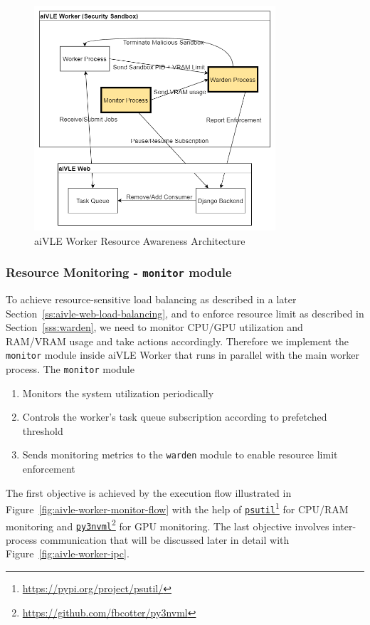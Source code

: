 \begin{figure}[H]
    \centering
    \includegraphics[width=0.8\textwidth]{images/aivle-worker-resource-awareness-arch.png}
    \caption{aiVLE Worker Resource Awareness Architecture}
    \label{fig:aivle-worker-resource-awareness-arch}
\end{figure}

\subsubsection{Resource Monitoring - \texttt{monitor} module}
\label{sss:monitor}
To achieve resource-sensitive load balancing as described in a later Section~\ref{ss:aivle-web-load-balancing}, and to enforce resource limit as described in Section~\ref{sss:warden}, we need to monitor CPU/GPU utilization and RAM/VRAM usage and take actions accordingly. Therefore we implement the \texttt{monitor} module inside aiVLE Worker that runs in parallel with the main worker process. The \texttt{monitor} module
\begin{enumerate}
    \item Monitors the system utilization periodically
    \item Controls the worker's task queue subscription according to prefetched threshold
    \item Sends monitoring metrics to the \texttt{warden} module to enable resource limit enforcement
\end{enumerate}

The first objective is achieved by the execution flow illustrated in Figure~\ref{fig:aivle-worker-monitor-flow} with the help of \href{https://pypi.org/project/psutil/}{\texttt{psutil}}\footnote{\href{https://pypi.org/project/psutil/}{https://pypi.org/project/psutil/}} for CPU/RAM monitoring and \href{https://github.com/fbcotter/py3nvml}{\texttt{py3nvml}}\footnote{\href{https://github.com/fbcotter/py3nvml}{https://github.com/fbcotter/py3nvml}} for GPU monitoring. The last objective involves inter-process communication that will be discussed later in detail with Figure~\ref{fig:aivle-worker-ipc}.

